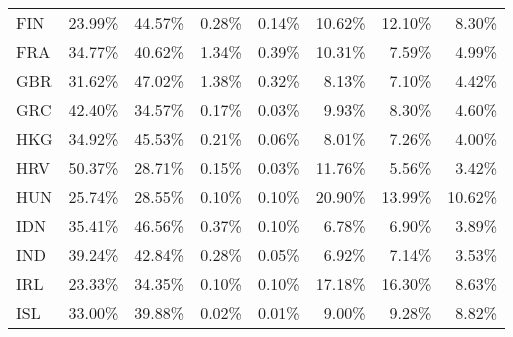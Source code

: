 \documentclass[a4paper,11pt]{article}
\begin{document}
\begin{table}[h]
\begin{tabular}{lrrrrrrr}
    FIN   & 23.99\% & 44.57\% & 0.28\% & 0.14\% & 10.62\% & 12.10\% & 8.30\% \\
    FRA   & 34.77\% & 40.62\% & 1.34\% & 0.39\% & 10.31\% & 7.59\% & 4.99\% \\
    GBR   & 31.62\% & 47.02\% & 1.38\% & 0.32\% & 8.13\% & 7.10\% & 4.42\% \\
    GRC   & 42.40\% & 34.57\% & 0.17\% & 0.03\% & 9.93\% & 8.30\% & 4.60\% \\
    HKG   & 34.92\% & 45.53\% & 0.21\% & 0.06\% & 8.01\% & 7.26\% & 4.00\% \\
    HRV   & 50.37\% & 28.71\% & 0.15\% & 0.03\% & 11.76\% & 5.56\% & 3.42\% \\
    HUN   & 25.74\% & 28.55\% & 0.10\% & 0.10\% & 20.90\% & 13.99\% & 10.62\% \\
    IDN   & 35.41\% & 46.56\% & 0.37\% & 0.10\% & 6.78\% & 6.90\% & 3.89\% \\
    IND   & 39.24\% & 42.84\% & 0.28\% & 0.05\% & 6.92\% & 7.14\% & 3.53\% \\
    IRL   & 23.33\% & 34.35\% & 0.10\% & 0.10\% & 17.18\% & 16.30\% & 8.63\% \\
    ISL   & 33.00\% & 39.88\% & 0.02\% & 0.01\% & 9.00\% & 9.28\% & 8.82\% \\
    \end{tabular}
\end{table}
\end{document}
